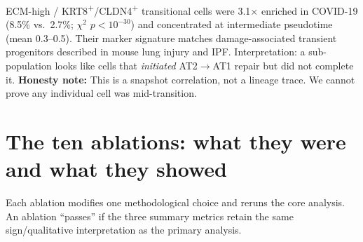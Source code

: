 \documentclass[11pt]{article}
\newcommand{\honest}[1]{\textcolor{red!70!black}{\textbf{Honesty note:} #1}}
\begin{document}
ECM-high / KRT8\textsuperscript{+}/CLDN4\textsuperscript{+} transitional cells were 3.1$\times$ enriched in COVID-19 (8.5\% vs.\ 2.7\%; $\chi^2$ $p < 10^{-30}$) and concentrated at intermediate pseudotime (mean 0.3--0.5). Their marker signature matches damage-associated transient progenitors described in mouse lung injury and IPF. Interpretation: a sub-population looks like cells that \emph{initiated} AT2$\rightarrow$AT1 repair but did not complete it. \honest{This is a snapshot correlation, not a lineage trace. We cannot prove any individual cell was mid-transition.}

\section{The ten ablations: what they were and what they showed}\label{sec:ablations}

Each ablation modifies one methodological choice and reruns the core analysis. An ablation ``passes'' if the three summary metrics retain the same sign/qualitative interpretation as the primary analysis.
\end{document}
